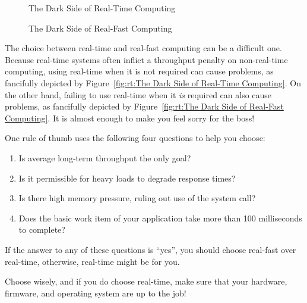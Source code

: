 \begin{figure}[tb]
\centering
{}
\caption{The Dark Side of Real-Time Computing}
\end{figure}

\begin{figure}[tb]
\centering
{}
\caption{The Dark Side of Real-Fast Computing}
\end{figure}

The choice between real-time and real-fast computing can be a difficult one.
Because real-time systems often inflict a throughput penalty on non-real-time
computing, using real-time when it is not required can cause problems,
as fancifully depicted by
Figure~\ref{fig:rt:The Dark Side of Real-Time Computing}.
On the other hand, failing to use real-time when it \emph{is} required
can also cause problems, as fancifully depicted by
Figure~\ref{fig:rt:The Dark Side of Real-Fast Computing}.
It is almost enough to make you feel sorry for the boss!

One rule of thumb uses the following four questions to help you choose:

\begin{enumerate}
\item	Is average long-term throughput the only goal?
\item	Is it permissible for heavy loads to degrade response times?
\item	Is there high memory pressure, ruling out use of
	the  system call?
\item	Does the basic work item of your application take more than
	100 milliseconds to complete?
\end{enumerate}

If the answer to any of these questions is ``yes'', you should choose
real-fast over real-time, otherwise, real-time might be for you.

Choose wisely, and if you do choose real-time, make sure that your
hardware, firmware, and operating system are up to the job!
